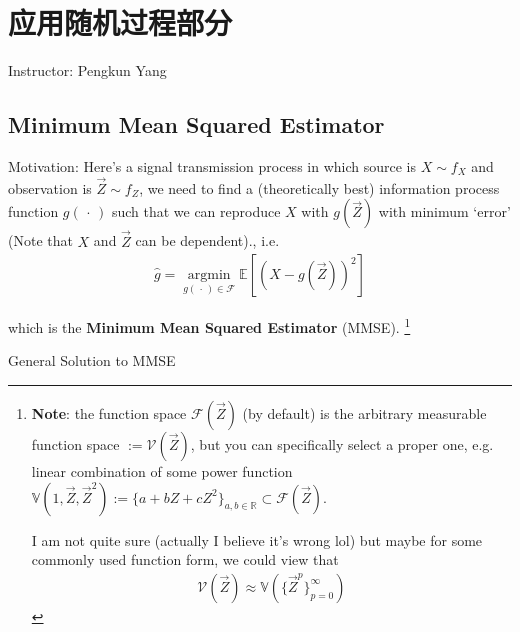 \section{应用随机过程部分}
\begin{center}
    Instructor: Pengkun Yang 
\end{center}

    





\subsection{Minimum Mean Squared Estimator}\label{SubSecMMSE}
    Motivation: Here's a signal transmission process in which source is $ X\sim f_{X} $ and observation is $ \vec{Z}\sim f_Z $, we need to find a (theoretically best) information process function $ g(\, \cdot \, ) $ such that we can reproduce $ X $ with $ g(\vec{Z}) $ with minimum `error' (Note that $ X$ and $\vec{Z} $ can be dependent)., i.e.
    \begin{align*}
        \hat{g}=\mathop{\arg\min}\limits_{g(\, \cdot \, )\in \mathscr{F}} \mathbb{E}\left[ (X-g(\vec{Z}))^2 \right] 
    \end{align*}

    which is the \textbf{Minimum Mean Squared Estimator} (MMSE). \footnote{\textbf{Note}: the function space $ \mathscr{F}(\vec{Z}) $ (by default) is the arbitrary measurable function space $ :=\mathscr{V}(\vec{Z}) $, but you can specifically select a proper one, e.g. linear combination of some power function $ \mathbb{V}(1,\vec{Z},\vec{Z}^2):=\{a+bZ+cZ^2\}_{a,b\in\mathbb{R}}\subset \mathscr{F}(\vec{Z}) $.
    
    I am not quite sure (actually I believe it's wrong lol) but maybe for some commonly used function form, we could view that
    \begin{align*}
        \mathscr{V}(\vec{Z})\approx \mathbb{V}(\{\vec{Z}^p\}_{p=0}^\infty) 
    \end{align*}
    
    }

\begin{point}
    General Solution to MMSE
\end{point}

